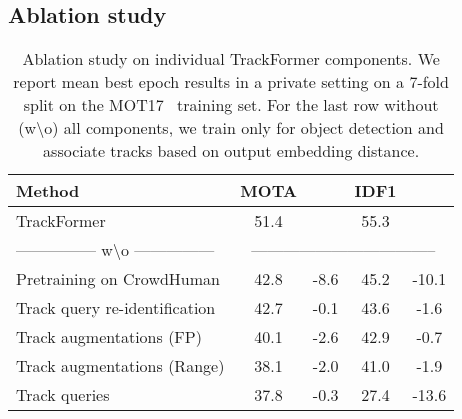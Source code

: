 \documentclass[10pt,twocolumn,letterpaper]{article}
\newcommand{\tablestyle}[2]{\setlength{\tabcolsep}{#1}\renewcommand{\arraystretch}{#2}\centering\footnotesize}
\begin{document}
\subsection{Ablation study} \label{sec:ablation_study}

\begin{table}
\tablestyle{1.2pt}{1.05}
     \vspace{-10pt}
    \begin{center}
\begin{tabular}[t]{l cccc}
            \toprule
            Method                                & \multicolumn{1}{c}{MOTA } &  & \multicolumn{1}{c}{IDF1 } & \\

            \midrule

            TrackFormer                             & 51.4 & & 55.3 & \\

            --------------- w\textbackslash o --------------- & \multicolumn{4}{c}{-----------------------------------}\\
            Pretraining on CrowdHuman                            & 42.8 & -8.6 & 45.2 & -10.1\\

            Track query re-identification                           & 42.7 & -0.1   & 43.6 & -1.6 \\



            Track augmentations (FP)                    & 40.1 & -2.6   & 42.9 & -0.7 \\

            Track augmentations (Range)                 & 38.1 & -2.0    & 41.0 & -1.9 \\



Track queries                                 & 37.8 & -0.3 & 27.4 & -13.6 \\

            \bottomrule
        \end{tabular}
         \vspace{-5pt}
\end{center}
\caption{
        Ablation study on individual TrackFormer components.
We report mean best epoch results in a private setting on a 7-fold split on the MOT17~\cite{MOT16} training set.
For the last row without (w\textbackslash o) all components, we train only for object detection and associate tracks based on output embedding distance.
    }
\vspace{-10pt}
    \label{tab:ablation_study}
\end{table}
 
\end{document}
